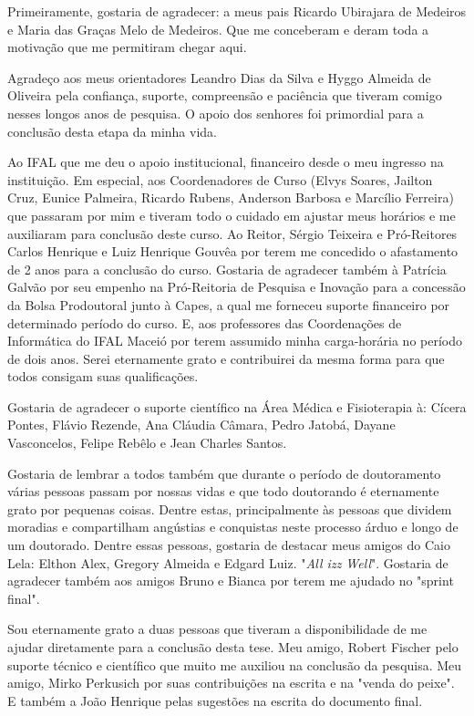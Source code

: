 Primeiramente, gostaria de agradecer: a meus pais Ricardo Ubirajara de Medeiros e Maria das Graças Melo de Medeiros. Que me conceberam e deram toda a motivação que me permitiram chegar aqui.

Agradeço aos meus orientadores Leandro Dias da Silva e Hyggo Almeida de Oliveira pela confiança, suporte, compreensão e paciência que tiveram comigo nesses longos anos de pesquisa. O apoio dos senhores foi primordial para a conclusão desta etapa da minha vida.

Ao IFAL que me deu o apoio institucional, financeiro desde o meu ingresso na instituição. Em especial, aos Coordenadores de Curso (Elvys Soares, Jailton Cruz, Eunice Palmeira, Ricardo Rubens, Anderson Barbosa e Marcílio Ferreira) que passaram por mim e tiveram todo o cuidado em ajustar meus horários e me auxiliaram para conclusão deste curso. Ao Reitor, Sérgio Teixeira e Pró-Reitores Carlos Henrique e Luiz Henrique Gouvêa por terem me concedido o afastamento de 2 anos para a conclusão do curso. Gostaria de agradecer também à Patrícia Galvão por seu empenho na Pró-Reitoria de Pesquisa e Inovação para a concessão da Bolsa Prodoutoral junto à Capes, a qual me forneceu suporte financeiro por determinado período do curso. E, aos professores das Coordenações de Informática do IFAL Maceió por terem assumido minha carga-horária no período de dois anos. Serei eternamente grato e contribuirei da mesma forma para que todos consigam suas qualificações.

Gostaria de agradecer o suporte científico na Área Médica e Fisioterapia à: Cícera Pontes, Flávio Rezende, Ana Cláudia Câmara, Pedro Jatobá, Dayane Vasconcelos, Felipe Rebêlo e Jean Charles Santos.

Gostaria de lembrar a todos também que durante o período de doutoramento várias pessoas passam por nossas vidas e que todo doutorando é eternamente grato por pequenas coisas. Dentre estas, principalmente às pessoas que dividem moradias e compartilham angústias e conquistas neste processo árduo e longo de um doutorado. Dentre essas pessoas, gostaria de destacar meus amigos do Caio Lela: Elthon Alex, Gregory Almeida e Edgard Luiz. "\textit{All izz Well}". Gostaria de agradecer também aos amigos Bruno e Bianca por terem me ajudado no "sprint final".

Sou eternamente grato a duas pessoas que tiveram a disponibilidade de me ajudar diretamente para a conclusão desta tese. Meu amigo, Robert Fischer pelo suporte técnico e científico que muito me auxiliou na conclusão da pesquisa. Meu amigo, Mirko Perkusich por suas contribuições na escrita e na "venda do peixe". E também a João Henrique pelas sugestões na escrita do documento final.

